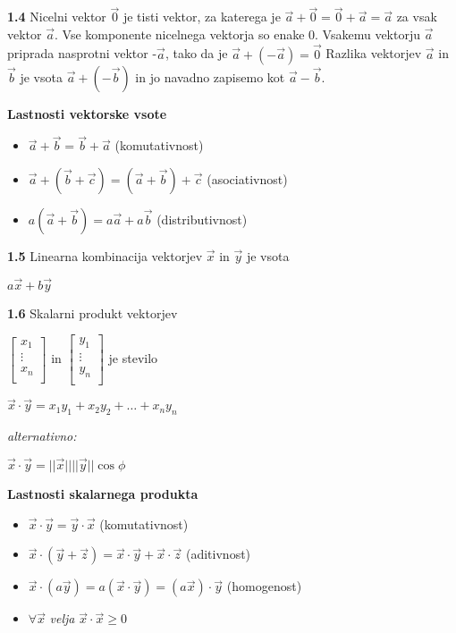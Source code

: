 \documentclass{article}
\begin{document}
\begin{multicols}{4}
	\textbf{1.4} Nicelni vektor $\vec{0}$ je tisti vektor, za katerega
	je $\vec{a} + \vec{0} = \vec{0} + \vec{a} = \vec{a}$ za vsak vektor
	$\vec{a}$. Vse komponente nicelnega vektorja so enake 0. Vsakemu vektorju
	$\vec{a}$ priprada nasprotni vektor -$\vec{a}$, tako da je $\vec{a} + (-\vec{a}) = \vec{0}$
	Razlika vektorjev $\vec{a}$ in $\vec{b}$ je vsota $\vec{a} + (-\vec{b})$ in jo
	navadno zapisemo kot  $\vec{a} - \vec{b}$.

	\textbf{Lastnosti vektorske vsote}
	\begin{itemize}
		\item $\vec{a} + \vec{b} = \vec{b} + \vec{a}$ (komutativnost)
		\item $\vec{a} + (\vec{b} + \vec{c}) = (\vec{a} + \vec{b}) + \vec{c}$ (asociativnost)
		\item $a(\vec{a} + \vec{b}) = a\vec{a} + a\vec{b}$ (distributivnost)
	\end{itemize}

	\textbf{1.5} Linearna kombinacija vektorjev $\vec{x}$ in $\vec{y}$ je vsota
	\begin{center}
		$a\vec{x} + b\vec{y}$
	\end{center}

	\textbf{1.6} Skalarni produkt vektorjev\\
	\begin{center}
		$\begin{bmatrix}
				x_{1}  \\
				\vdots \\
				x_{n}  \\
			\end{bmatrix}$ in
		$\begin{bmatrix}
				y_{1}  \\
				\vdots \\
				y_{n}  \\
			\end{bmatrix}$ je stevilo
	\end{center}
	\begin{center}
		$\vec{x} \cdot \vec{y} = x_{1}y_{1} + x_{2}y_{2} + \dots + x_{n}y_{n}$
	\end{center} \textit{alternativno:}
	\begin{center}
		$\vec{x} \cdot \vec{y} = ||\vec{x}|| ||\vec{y}|| \cos \phi$
	\end{center}

	\textbf{Lastnosti skalarnega produkta}
	\begin{itemize}
		\item $\vec{x} \cdot \vec{y} = \vec{y} \cdot \vec{x}$ (komutativnost)
		\item $\vec{x} \cdot (\vec{y} + \vec{z}) = \vec{x} \cdot \vec{y} + \vec{x} \cdot \vec{z}$ (aditivnost)
		\item $\vec{x} \cdot (a \vec{y}) = a(\vec{x} \cdot \vec{y}) = (a \vec{x}) \cdot \vec{y}$ (homogenost)
		\item $\forall \vec{x}$ \textit{velja} $\vec{x} \cdot \vec{x} \geq 0$
	\end{itemize}


\end{multicols}
\end{document}
